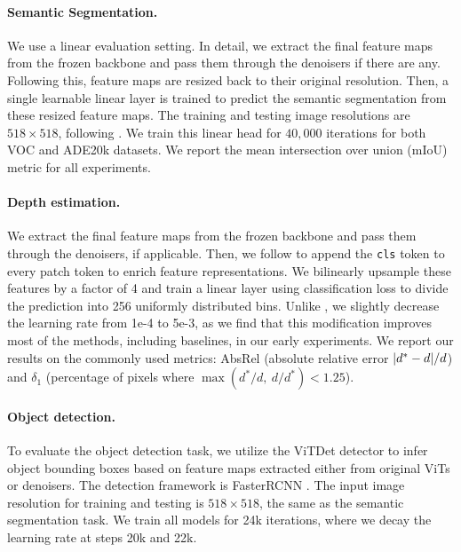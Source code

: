 \paragraph{Semantic Segmentation.} We use a linear evaluation setting. In detail, we extract the final feature maps from the frozen backbone and pass them through the denoisers if there are any. Following this, feature maps are resized back to their original resolution. Then, a single learnable linear layer is trained to predict the semantic segmentation from these resized feature maps. The training and testing image resolutions are $518\times 518$, following \cite{oquab2023dinov2}. We train this linear head for $40,000$ iterations for both VOC and ADE20k datasets. We report the mean intersection over union (mIoU) metric for all experiments.

\paragraph{Depth estimation.} We extract the final feature maps from the frozen backbone and pass them through the denoisers, if applicable. Then, we follow \cite{oquab2023dinov2} to append the \texttt{cls} token to every patch token to enrich feature representations. We bilinearly upsample these features by a factor of 4 and train a linear layer using classification loss to divide the prediction into 256 uniformly distributed bins. Unlike \cite{oquab2023dinov2}, we slightly decrease the learning rate from 1e-4 to 5e-3, as we find that this modification improves most of the methods, including baselines, in our early experiments.
We report our results on the commonly used metrics: AbsRel (absolute relative error $\abs{d^{*} - d}/d$) and $\delta_1$ (percentage of pixels where $\max(d^{*}/d,~ d/d^{*}) < 1.25$).


\paragraph{Object detection.} To evaluate the object detection task, we utilize the ViTDet detector \cite{li2022exploring} to infer object bounding boxes based on feature maps extracted either from original ViTs or denoisers. The detection framework is FasterRCNN \cite{ren2015faster}. The input image resolution for training and testing is $518\times 518$, the same as the semantic segmentation task. We train all models for 24k iterations, where we decay the learning rate at steps 20k and 22k.

